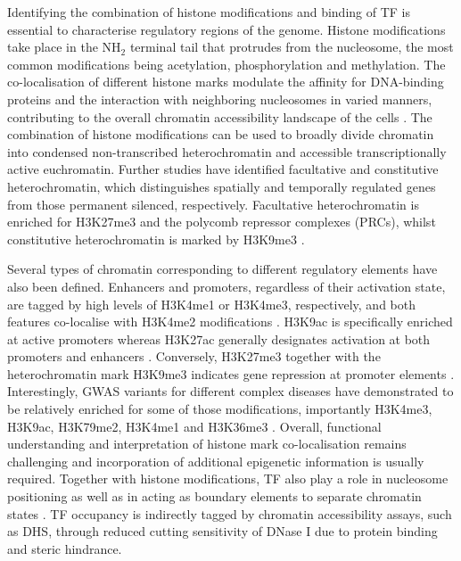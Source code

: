 Identifying the combination of histone modifications and binding of TF is essential to characterise regulatory regions of the genome. Histone modifications take place in the NH$_2$ terminal tail that protrudes from the nucleosome, the most common modifications being acetylation, phosphorylation and methylation. The co-localisation of different histone marks modulate the affinity for DNA-binding proteins and the interaction with neighboring nucleosomes in varied manners, contributing to the overall chromatin accessibility landscape of the cells \parencite{Jenuwein2001, Bannister2011}.
The combination of histone modifications can be used to broadly divide chromatin into condensed non-transcribed heterochromatin and accessible transcriptionally active euchromatin. Further studies have identified facultative and constitutive heterochromatin, which distinguishes spatially and temporally regulated genes from those permanent silenced, respectively. Facultative heterochromatin is enriched for H3K27me3 and the polycomb repressor complexes (PRCs), whilst constitutive heterochromatin is marked by H3K9me3 \parencite{Hansen2008,Bannister2001}.

Several types of chromatin corresponding to different regulatory elements have also been defined. Enhancers and promoters, regardless of their activation state, are tagged by high levels of H3K4me1 or H3K4me3, respectively, and both features co-localise with H3K4me2 modifications \parencite{Heintzman2007,Hon2009}. H3K9ac is specifically enriched at active promoters whereas H3K27ac generally designates activation at both promoters and enhancers \parencite{Hon2009,Creyghton2010}. Conversely, H3K27me3 together with the heterochromatin mark H3K9me3 indicates gene repression at promoter elements \parencite{Hansen2008,Bannister2001,Pan2007}. Interestingly, GWAS variants for different complex diseases have demonstrated to be relatively enriched for some of those modifications, importantly H3K4me3, H3K9ac, H3K79me2, H3K4me1 and H3K36me3 \parencite{Ernst2011, Trynka2013}. Overall, functional understanding and interpretation of histone mark co-localisation remains challenging and incorporation of additional epigenetic information is usually required. 
Together with histone modifications, TF also play a role in nucleosome positioning as well as in acting as boundary elements to separate chromatin states \parencite{Vierstra2014,Zhang2009,Bell2000}. TF occupancy is indirectly tagged by chromatin accessibility assays, such as DHS, through reduced cutting sensitivity of DNase I due to protein binding and steric hindrance. 

